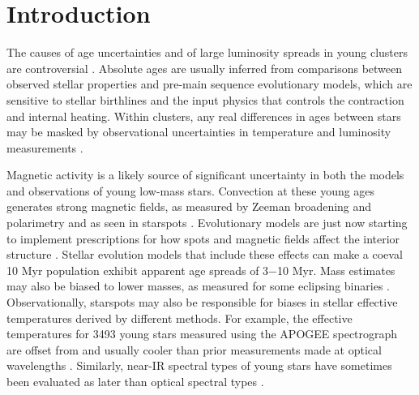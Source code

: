 \documentclass[twocolumn]{emulateapj}%
\begin{document}
\section{Introduction}\label{sec:intro}
The causes of age uncertainties and of large luminosity spreads in young clusters are controversial \citep[see reviews by][]{preibisch12,soderblom14}.  Absolute ages are usually inferred from comparisons between observed stellar properties and pre-main sequence evolutionary models, which are sensitive to stellar birthlines and the input physics that controls the contraction and internal heating.  Within clusters, any real differences in ages between stars may be masked by observational uncertainties in temperature and luminosity measurements \citep[e.g.][]{hartmann01,slesnick08}.

Magnetic activity is a likely source of significant uncertainty in both the models and observations of young low-mass stars. Convection at these young ages generates strong magnetic fields, as measured by Zeeman broadening and polarimetry \citep[e.g.][]{johnskrull07,donati09} and as seen in starspots \citep[e.g.][]{stauffer03,grankin08}.  Evolutionary models are just now starting to implement prescriptions for how spots and magnetic fields affect the interior structure \citep{macdonald13,jackson14a,somers15,feiden16}.  Stellar evolution models that include these effects can make a coeval 10 Myr population exhibit apparent age spreads of 3$-$10 Myr.  Mass estimates may also be biased to lower masses, as measured for some eclipsing binaries \citep[e.g.][]{stassun14,rizzuto16}.   Observationally, starspots may also be responsible for biases in stellar effective temperatures derived by different methods.  For example, the effective temperatures for 3493 young stars measured using the APOGEE spectrograph \citep[$1.5-1.70 \;\mu$m at $R=22,500$][]{wilson10} are offset from and usually cooler than prior measurements made at optical wavelengths \citep{cottaar14}.  Similarly, near-IR spectral types of young stars have sometimes been evaluated as later than optical spectral types \citep{bouvier92,vacca11}.
\end{document}

